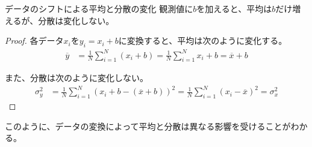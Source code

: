 \documentclass[../../../topic_statistics]{subfiles}
\begin{document}
\begin{theorem}{データのシフトによる平均と分散の変化}
  観測値に$b$を加えると、平均は$b$だけ増えるが、分散は変化しない。
\end{theorem}

\begin{proof}
  各データ$x_i$を$y_i = x_i + b$に変換すると、平均は次のように変化する。
  \begin{align*}
    \overline{y} &= \frac{1}{N} \sum_{i=1}^{N} (x_i + b) = \frac{1}{N} \sum_{i=1}^{N} x_i + b = \overline{x} + b
  \end{align*}

  また、分散は次のように変化しない。
  \begin{align*}
    \sigma_y^2 &= \frac{1}{N} \sum_{i=1}^{N} (x_i + b - (\overline{x} + b))^2 = \frac{1}{N} \sum_{i=1}^{N} (x_i - \overline{x})^2 = \sigma_x^2
  \end{align*}
\end{proof}

\br

このように、データの変換によって平均と分散は異なる影響を受けることがわかる。
\end{document}
